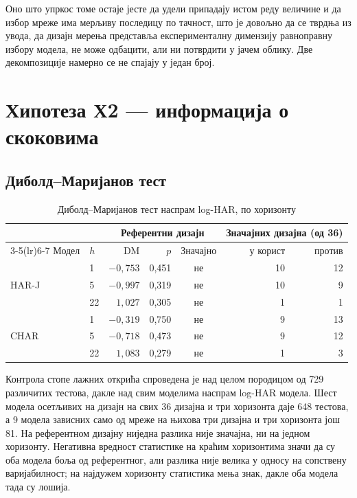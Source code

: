 Оно што упркос томе остаје јесте да удели припадају истом реду величине и да избор мреже
има мерљиву последицу по тачност, што је довољно да се тврдња из увода, да дизајн мерења
представља експерименталну димензију равноправну избору модела, не може одбацити, али ни
потврдити у јачем облику. Две декомпозиције намерно се не спајају у
један број.

\section{Хипотеза Х2 — информација о скоковима}
\label{sec:rez-h2}

\subsection{Диболд–Маријанов тест}

\begin{table}[htbp]
\centering
\caption{Диболд–Маријанов тест наспрам log-HAR, по хоризонту}
\label{tab:dm}
\begin{tabular}{llrrc rr}
\toprule
& & \multicolumn{3}{c}{Референтни дизајн} & \multicolumn{2}{c}{Значајних дизајна (од 36)} \\
\cmidrule(lr){3-5}\cmidrule(lr){6-7}
Модел & $h$ & DM & $p$ & Значајно & у корист & против \\
\midrule
\multirow{3}{*}{HAR-J}
& 1  & $-0{,}753$ & 0,451 & не & 10 & 12 \\
& 5  & $-0{,}997$ & 0,319 & не & 10 & 9 \\
& 22 & $1{,}027$  & 0,305 & не & 1  & 1 \\
\midrule
\multirow{3}{*}{CHAR}
& 1  & $-0{,}319$ & 0,750 & не & 9  & 13 \\
& 5  & $-0{,}718$ & 0,473 & не & 9  & 12 \\
& 22 & $1{,}083$  & 0,279 & не & 1  & 3 \\
\bottomrule
\end{tabular}
\end{table}

Контрола стопе лажних открића спроведена је над целом породицом од 729 различитих
тестова, дакле над свим моделима наспрам log-HAR модела. Шест модела осетљивих на дизајн
на свих 36 дизајна и три хоризонта даје 648 тестова, а 9 модела зависних само од
мреже на њихова три дизајна и три хоризонта још 81. На референтном дизајну ниједна разлика није значајна, ни на једном хоризонту.
Негативна вредност статистике на краћим хоризонтима значи да су оба модела боља од
референтног, али разлика није велика у односу на сопствену варијабилност; на најдужем
хоризонту статистика мења знак, дакле оба модела тада су лошија.

